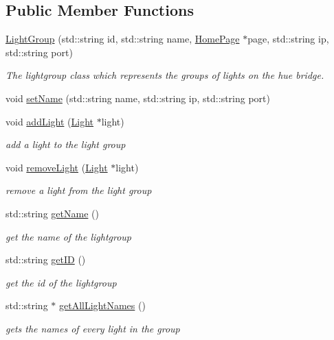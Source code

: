 \subsection*{Public Member Functions}
\begin{DoxyCompactItemize}
\item 
\hyperlink{class_light_group_a640052573b06ee856b04158f83835210}{Light\+Group} (std\+::string id, std\+::string name, \hyperlink{class_home_page}{Home\+Page} $\ast$page, std\+::string ip, std\+::string port)
\begin{DoxyCompactList}\small\item\em The lightgroup class which represents the groups of lights on the hue bridge. \end{DoxyCompactList}\item 
void \hyperlink{class_light_group_a31d089214736e7c6d9896a4977a9e956}{set\+Name} (std\+::string name, std\+::string ip, std\+::string port)
\item 
void \hyperlink{class_light_group_a1586f3bce7da99ab50e6e35f9598effd}{add\+Light} (\hyperlink{class_light}{Light} $\ast$light)
\begin{DoxyCompactList}\small\item\em add a light to the light group \end{DoxyCompactList}\item 
void \hyperlink{class_light_group_a4c401d9a379641cfad1a5aa643a91e25}{remove\+Light} (\hyperlink{class_light}{Light} $\ast$light)
\begin{DoxyCompactList}\small\item\em remove a light from the light group \end{DoxyCompactList}\item 
std\+::string \hyperlink{class_light_group_a8bcdd2d8d6acfbdeac93c0708bddebf5}{get\+Name} ()
\begin{DoxyCompactList}\small\item\em get the name of the lightgroup \end{DoxyCompactList}\item 
std\+::string \hyperlink{class_light_group_af2a28bb84204d5cd64420ea213e86d8d}{get\+ID} ()
\begin{DoxyCompactList}\small\item\em get the id of the lightgroup \end{DoxyCompactList}\item 
std\+::string $\ast$ \hyperlink{class_light_group_a9e5a81ac9940935dbc87a3a33ebe7fc4}{get\+All\+Light\+Names} ()
\begin{DoxyCompactList}\small\item\em gets the names of every light in the group \end{DoxyCompactList}\item 

\end{DoxyCompactItemize}
